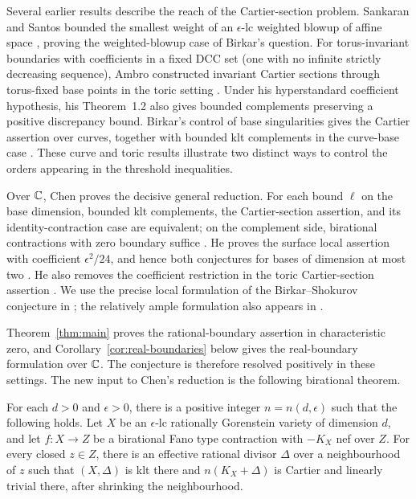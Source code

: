 Several earlier results describe the reach of the Cartier-section problem. Sankaran and Santos bounded the smallest weight of an $\epsilon$-lc weighted blowup of affine space \cite[Theorem~1.3]{SankaranSantos}, proving the weighted-blowup case of Birkar's question. For torus-invariant boundaries with coefficients in a fixed DCC set (one with no infinite strictly decreasing sequence), Ambro constructed invariant Cartier sections through torus-fixed base points in the toric setting \cite[Theorem~3.12, arXiv version~2]{AmbroToric}. Under his hyperstandard coefficient hypothesis, his Theorem~1.2 also gives bounded complements preserving a positive discrepancy bound. Birkar's control of base singularities gives the Cartier assertion over curves, together with bounded klt complements in the curve-base case \cite[Theorem~1.1 and Corollary~1.4]{BirkarCY}. These curve and toric results illustrate two distinct ways to control the orders appearing in the threshold inequalities.

Over $\mathbb C$, Chen proves the decisive general reduction. For each bound $\ell$ on the base dimension, bounded klt complements, the Cartier-section assertion, and its identity-contraction case are equivalent; on the complement side, birational contractions with zero boundary suffice \cite[Theorem~1.6]{Chen2025}. He proves the surface local assertion with coefficient $\epsilon^2/24$, and hence both conjectures for bases of dimension at most two \cite[Theorem~1.7 and Corollary~1.8]{Chen2025}. He also removes the coefficient restriction in the toric Cartier-section assertion \cite[Theorem~1.11]{Chen2025}. We use the precise local formulation of the Birkar--Shokurov conjecture in \cite[Conjecture~1.3]{Chen2025}; the relatively ample formulation also appears in \cite[Conjecture~1.27]{BirkarSurvey}.

Theorem~\ref{thm:main} proves the rational-boundary assertion in characteristic zero, and Corollary~\ref{cor:real-boundaries} below gives the real-boundary formulation over $\mathbb C$. The conjecture is therefore resolved positively in these settings. The new input to Chen's reduction is the following birational theorem.

\begin{maintheorem}\label{thm:birational}
For each $d>0$ and $\epsilon>0$, there is a positive integer $n=n(d,\epsilon)$ such that the following holds. Let $X$ be an $\epsilon$-lc rationally Gorenstein variety of dimension $d$, and let $f:X\to Z$ be a birational Fano type contraction with $-K_X$ nef over $Z$. For every closed $z\in Z$, there is an effective rational divisor $\Delta$ over a neighbourhood of $z$ such that $(X,\Delta)$ is klt there and $n(K_X+\Delta)$ is Cartier and linearly trivial there, after shrinking the neighbourhood.
\end{maintheorem}

